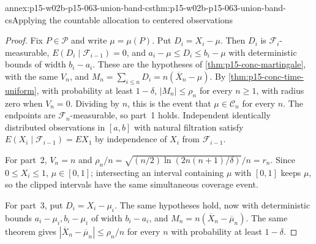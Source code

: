 \begin{annexitem}{annex:p15-w02b-p15-063-union-band-cs}{thm:p15-w02b-p15-063-union-band-cs}{Applying the countable allocation to centered observations}
\begin{proof}
Fix \(P\in\mathcal P\) and write \(\mu=\mu(P)\). Put \(D_i=X_i-\mu\).
Then \(D_i\) is \(\mathcal F_i\)-measurable,
\(E(D_i\mid\mathcal F_{i-1})=0\), and \(a_i-\mu\leq D_i\leq b_i-\mu\) with
deterministic bounds of width \(b_i-a_i\). These are the hypotheses of
\cref{thm:p15-conc-martingale}, with the same \(V_n\), and
\(M_n=\sum_{i\leq n}D_i=n(\overline X_n-\mu)\). By
\cref{thm:p15-conc-time-uniform}, with probability at least \(1-\delta\),
\(|M_n|\leq\rho_n\) for every \(n\geq1\), with radius zero when
\(V_n=0\). Dividing by \(n\), this is the event that
\(\mu\in\mathcal C_n\) for every \(n\). The endpoints are
\(\mathcal F_n\)-measurable, so part~1 holds. Independent identically
distributed observations in \([a,b]\) with natural filtration satisfy
\(E(X_i\mid\mathcal F_{i-1})=EX_1\) by independence of \(X_i\) from
\(\mathcal F_{i-1}\).

For part~2, \(V_n=n\) and
\(\rho_n/n=\sqrt{(n/2)\ln(2n(n+1)/\delta)}/n=r_n\). Since
\(0\leq X_i\leq1\), \(\mu\in[0,1]\); intersecting an interval containing
\(\mu\) with \([0,1]\) keeps \(\mu\), so the clipped intervals have the
same simultaneous coverage event.

For part~3, put \(D_i=X_i-\mu_i\). The same hypotheses hold, now with
deterministic bounds \(a_i-\mu_i,b_i-\mu_i\) of width \(b_i-a_i\), and
\(M_n=n(\overline X_n-\overline\mu_n)\). The same theorem gives
\(|\overline X_n-\overline\mu_n|\leq\rho_n/n\) for every \(n\) with
probability at least \(1-\delta\).
\end{proof}
\end{annexitem}

